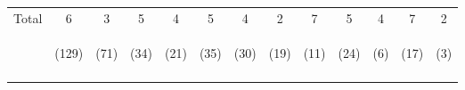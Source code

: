 \begin{tabular}{lcccccccccccc}
\noalign{\smallskip}Total & 6 & 3 & 5 & 4 & 5 & 4 & 2 & 7 & 5 & 4 & 7 & 2\\
 & \begin{footnotesize}(129)\end{footnotesize} & \begin{footnotesize}(71)\end{footnotesize} & \begin{footnotesize}(34)\end{footnotesize} & \begin{footnotesize}(21)\end{footnotesize} & \begin{footnotesize}(35)\end{footnotesize} & \begin{footnotesize}(30)\end{footnotesize} & \begin{footnotesize}(19)\end{footnotesize} & \begin{footnotesize}(11)\end{footnotesize} & \begin{footnotesize}(24)\end{footnotesize} & \begin{footnotesize}(6)\end{footnotesize} & \begin{footnotesize}(17)\end{footnotesize} & \begin{footnotesize}(3)\end{footnotesize}\\
\noalign{\smallskip}\hline\end{tabular}\\
